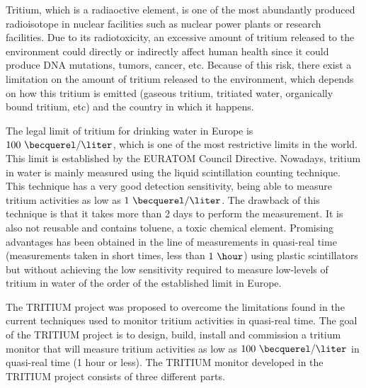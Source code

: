 Tritium, which is a radiaoctive element, is one of the most abundantly produced radioisotope in nuclear facilities such as nuclear power plants or research facilities. Due to its radiotoxicity, an excessive amount of tritium released to the environment could directly or indirectly affect human health since it could produce DNA mutations, tumors, cancer, etc. Because of this risk, there exist a limitation on the amount of tritium released to the environment, which depends on how this tritium is emitted (gaseous tritium, tritiated water, organically bound tritium, etc) and the country in which it happens.

The legal limit of tritium for drinking water in Europe is $100~\becquerel/\liter$, which is one of the most restrictive limits in the world. This limit is established by the EURATOM Council Directive. Nowadays, tritium in water is mainly measured using the liquid scintillation counting technique. This technique has a very good detection sensitivity, being able to measure tritium activities as low as $1~\becquerel/\liter$. The drawback of this technique is that it takes more than 2 days to perform the measurement. It is also not reusable and contains toluene, a toxic chemical element. Promising advantages has been obtained in the line of measurements in quasi-real time (measurements taken in short times, less than $1~\hour$) using plastic scintillators but without achieving the low sensitivity required to measure low-levels of tritium in water of the order of the established limit in Europe.

The TRITIUM project was proposed to overcome the limitations found in the current techniques used to monitor tritium activities in quasi-real time. The goal of the TRITIUM project is to design, build, install and commission a tritium monitor that will measure tritium activities as low as $100~\becquerel/\liter$  in quasi-real time (1 hour or less). The TRITIUM monitor developed in the TRITIUM project consists of three different parts.

